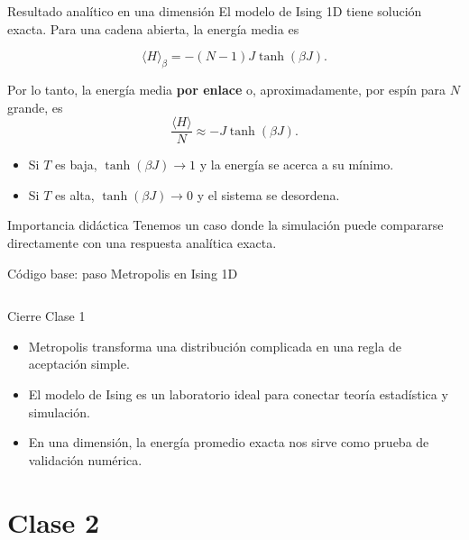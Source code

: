 \begin{frame}{Resultado analítico en una dimensión}
\justifying
El modelo de Ising 1D tiene solución exacta. Para una cadena abierta, la energía media es

\begin{equation*}
\langle H \rangle_\beta = -(N-1)J\tanh(\beta J).
\end{equation*}

Por lo tanto, la energía media \textbf{por enlace} o, aproximadamente, por espín para $N$ grande, es
\begin{equation*}
\frac{\langle H \rangle}{N} \approx -J\tanh(\beta J).
\end{equation*}

\begin{itemize}
    \item Si $T$ es baja, $\tanh(\beta J)\to 1$ y la energía se acerca a su mínimo.
    \item Si $T$ es alta, $\tanh(\beta J)\to 0$ y el sistema se desordena.
\end{itemize}

\begin{alertblock}{Importancia didáctica}
Tenemos un caso donde la simulación puede compararse directamente con una respuesta analítica exacta.
\end{alertblock}
\end{frame}

\begin{frame}[fragile]{Código base: paso Metropolis en Ising 1D}
\inputminted[firstline=12,lastline=24]{python}{ising1d.py}
\end{frame}

\begin{frame}{Cierre Clase 1}
\begin{itemize}
    \item Metropolis transforma una distribución complicada en una regla de aceptación simple.
    \item El modelo de Ising es un laboratorio ideal para conectar teoría estadística y simulación.
    \item En una dimensión, la energía promedio exacta nos sirve como prueba de validación numérica.
\end{itemize}
\end{frame}

\section{Clase 2}

